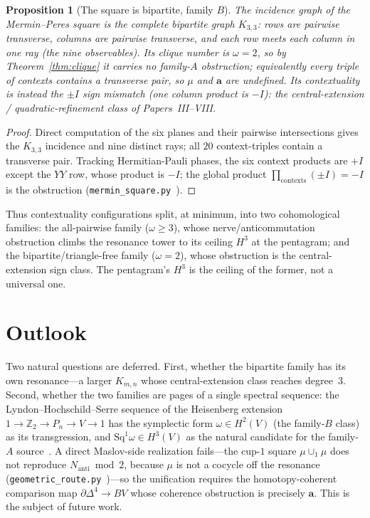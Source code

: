 \documentclass[11pt,a4paper]{article}
\newcommand{\Nanti}{N_{\mathrm{anti}}}
\newcommand{\Z}{\mathbb{Z}}
\theoremstyle{plain}
\newtheorem{proposition}[theorem]{Proposition}
\theoremstyle{definition}
\theoremstyle{remark}
\begin{document}
\begin{proposition}[The square is bipartite, family $B$]\label{prop:square}
The incidence graph of the Mermin--Peres square is the complete bipartite graph
$K_{3,3}$: rows are pairwise transverse, columns are pairwise transverse, and each
row meets each column in one ray (the nine observables).  Its clique number is
$\omega=2$, so by Theorem~\ref{thm:clique} it carries \emph{no} family-$A$
obstruction; equivalently every triple of contexts contains a transverse pair, so
$\mu$ and $\mathbf a$ are undefined.  Its contextuality is instead the
$\pm I$ sign mismatch (one column product is $-I$): the central-extension /
quadratic-refinement class of Papers~III--VIII.
\end{proposition}

\begin{proof}
Direct computation of the six planes and their pairwise intersections gives the
$K_{3,3}$ incidence and nine distinct rays; all $20$ context-triples
contain a transverse pair.  Tracking Hermitian-Pauli phases, the six context
products are $+I$ except the $YY$ row, whose product is $-I$; the global product
$\prod_{\text{contexts}}(\pm I)=-I$ is the obstruction
(\texttt{mermin\_square.py}~\cite{PaperXXIIsuppl}).
\end{proof}

Thus contextuality configurations split, at minimum, into two cohomological
families: the all-pairwise family ($\omega\ge3$), whose nerve/anticommutation
obstruction climbs the resonance tower to its ceiling $H^3$ at the pentagram; and
the bipartite/triangle-free family ($\omega=2$), whose obstruction is the
central-extension sign class.  The pentagram's $H^3$ is the ceiling of the former,
not a universal one.

\section{Outlook}

Two natural questions are deferred.  First, whether the bipartite family has its own
resonance---a larger $K_{m,n}$ whose central-extension class reaches degree~$3$.
Second, whether the two families are pages of a single spectral sequence: the
Lyndon--Hochschild--Serre sequence of the Heisenberg extension
$1\to\Z_2\to P_n\to V\to1$ has the symplectic form $\omega\in H^2(V)$
(the family-$B$ class) as its transgression, and $\mathrm{Sq}^1\omega\in H^3(V)$ as
the natural candidate for the family-$A$ source~\cite{PaperIV}.  A direct
Maslov-side realization fails---the cup-$1$ square $\mu\cup_1\mu$ does not reproduce
$\Nanti\bmod2$, because $\mu$ is not a cocycle off the resonance
(\texttt{geometric\_route.py}~\cite{PaperXXIIsuppl})---so the unification requires
the homotopy-coherent comparison map $\partial\Delta^4\to BV$ whose coherence
obstruction is precisely $\mathbf a$.  This is the subject of future work.
\end{document}
